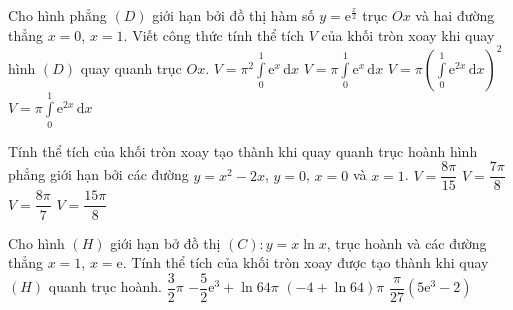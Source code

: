 	\begin{ex}%
		Cho hình phẳng $(D)$ giới hạn bởi đồ thị hàm số $y=\mathrm{e}^{\tfrac{x}{2}}$ trục $Ox$ và hai đường thẳng $x=0$, $x=1$. Viết công thức tính thể tích $V$ của khối tròn xoay khi quay hình $(D)$ quay quanh trục $Ox$. 
		\choice
		{$V=\pi^2\displaystyle\int\limits_0^1\mathrm{e}^x\mathrm{\,d}x$}
		{\True $V=\pi\displaystyle\int\limits_0^1\mathrm{e}^x\mathrm{\,d}x$}
		{$V=\pi\left(\displaystyle\int\limits_0^1\mathrm{e}^{2x}\mathrm{\,d}x\right)^2$}
		{$V=\pi\displaystyle\int\limits_0^1\mathrm{e}^{2x}\mathrm{\,d}x$}
	\end{ex}

	\begin{ex}%
		Tính thể tích của khối tròn xoay tạo thành khi quay quanh trục hoành hình phẳng giới hạn bởi các đường $y=x^2-2x$, $y=0$, $x=0$ và $x=1$. 
		\choice
		{\True $V=\dfrac{8\pi}{15}$}
		{$V=\dfrac{7\pi}{8}$}
		{$V=\dfrac{8\pi}{7}$}
		{$V=\dfrac{15\pi}{8}$}
	\end{ex}

	\begin{ex}%
		Cho hình $(H)$ giới hạn bở đồ thị $(C)\colon y=x\ln x$, trục hoành và các đường thẳng $x=1$, $x=\mathrm{e}$. Tính thể tích của khối tròn xoay được tạo thành khi quay $(H)$ quanh trục hoành. 
		\choice
		{$\dfrac{3}{2}\pi$}
		{$-\dfrac{5}{2}\mathrm{e}^3+\ln 64\pi$}
		{$(-4+\ln 64)\pi$}
		{\True $\dfrac{\pi}{27}\left(5\mathrm{e}^3-2\right)$}
	\end{ex}


